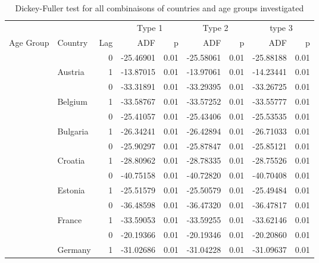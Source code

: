 \documentclass[
]{article}
\begin{document}
\begin{table}
\centering
\caption{\label{tab:unnamed-chunk-2}Dickey-Fuller test for all combinaisons of countries and age groups investigated}
\centering
\begin{tabular}[t]{l|l|r|r|r|r|r|r|r}
\hline
\multicolumn{3}{c|}{ } & \multicolumn{2}{c|}{Type 1} & \multicolumn{2}{c|}{Type 2} & \multicolumn{2}{c}{type 3} \\
\cline{4-5} \cline{6-7} \cline{8-9}
Age Group & Country & Lag & ADF & p & ADF & p & ADF & p\\
\hline
 &  & 0 & -25.46901 & 0.01 & -25.58061 & 0.01 & -25.88188 & 0.01\\
\cline{3-9}
 & \multirow{-2}{*}{\raggedright\arraybackslash Austria} & 1 & -13.87015 & 0.01 & -13.97061 & 0.01 & -14.23441 & 0.01\\
\cline{2-9}
 &  & 0 & -33.31891 & 0.01 & -33.29395 & 0.01 & -33.26725 & 0.01\\
\cline{3-9}
 & \multirow{-2}{*}{\raggedright\arraybackslash Belgium} & 1 & -33.58767 & 0.01 & -33.57252 & 0.01 & -33.55777 & 0.01\\
\cline{2-9}
 &  & 0 & -25.41057 & 0.01 & -25.43406 & 0.01 & -25.53535 & 0.01\\
\cline{3-9}
 & \multirow{-2}{*}{\raggedright\arraybackslash Bulgaria} & 1 & -26.34241 & 0.01 & -26.42894 & 0.01 & -26.71033 & 0.01\\
\cline{2-9}
 &  & 0 & -25.90297 & 0.01 & -25.87847 & 0.01 & -25.85121 & 0.01\\
\cline{3-9}
 & \multirow{-2}{*}{\raggedright\arraybackslash Croatia} & 1 & -28.80962 & 0.01 & -28.78335 & 0.01 & -28.75526 & 0.01\\
\cline{2-9}
 &  & 0 & -40.75158 & 0.01 & -40.72820 & 0.01 & -40.70408 & 0.01\\
\cline{3-9}
 & \multirow{-2}{*}{\raggedright\arraybackslash Estonia} & 1 & -25.51579 & 0.01 & -25.50579 & 0.01 & -25.49484 & 0.01\\
\cline{2-9}
 &  & 0 & -36.48598 & 0.01 & -36.47320 & 0.01 & -36.47817 & 0.01\\
\cline{3-9}
 & \multirow{-2}{*}{\raggedright\arraybackslash France} & 1 & -33.59053 & 0.01 & -33.59255 & 0.01 & -33.62146 & 0.01\\
\cline{2-9}
 &  & 0 & -20.19366 & 0.01 & -20.19346 & 0.01 & -20.20860 & 0.01\\
\cline{3-9}
 & \multirow{-2}{*}{\raggedright\arraybackslash Germany} & 1 & -31.02686 & 0.01 & -31.04228 & 0.01 & -31.09637 & 0.01\\

\end{tabular}
\end{table}
\end{document}
